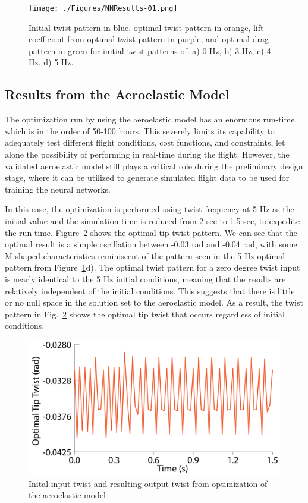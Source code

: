 \documentclass[11pt]{ucthesis}
\begin{document}
\begin{figure}[thpb]
\centering
\texttt{[image: ./Figures/NNResults-01.png]}
\caption{Initial twist pattern in blue, optimal twist pattern in orange, lift coefficient from optimal twist pattern in purple, and optimal drag pattern in green for initial twist patterns of: a) 0 Hz, b) 3 Hz, c) 4 Hz, d) 5 Hz.}
\label{fig:NNResults}
\end{figure}

\subsection{Results from the Aeroelastic Model}
 The optimization run by using the aeroelastic model has an enormous run-time, which is in the order of 50-100 hours. This severely limits its capability to adequately test different flight conditions, cost functions, and constraints, let alone the possibility of performing in real-time during the flight. However, the validated aeroelastic model still plays a critical role during the preliminary design stage, where it can be utilized to generate simulated flight data to be used for training the neural networks.   

In this case, the optimization is performed using twist frequency at 5 Hz as the initial value and the simulation time is reduced from 2 sec to 1.5 sec, to expedite the run time. Figure~\ref{fig:AeroTwist} shows the optimal tip twist pattern. We can see that the optimal result is a simple oscillation between -0.03 rad and -0.04 rad, with some M-shaped characteristics reminiscent of the pattern seen in the 5 Hz optimal pattern from Figure~\ref{fig:NNResults}d). The optimal twist pattern for a zero degree twist input is nearly identical to the 5 Hz initial conditions, meaning that the results are relatively independent of the initial conditions. This suggests that there is little or no null space in the solution set to the aeroelastic model. As a result, the twist pattern in Fig.~\ref{fig:AeroTwist} shows the optimal tip twist that occurs regardless of initial conditions.

\begin{figure}[thpb]
\centering
\includegraphics[width=1\linewidth]{./Figures/AeroOptimalTwist-01.png}
\caption{Inital input twist and resulting output twist from optimization of the aeroelastic model}
\label{fig:AeroTwist}
\end{figure}
\end{document}
